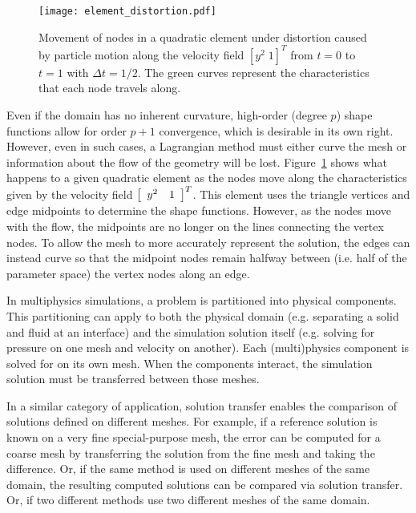 \documentclass[oneside, reqno]{amsart}
\theoremstyle{definition}
\begin{document}
\begin{figure}
  \texttt{[image: element\_distortion.pdf]}
  \centering
  \captionsetup{width=.75\linewidth}
  \caption{Movement of nodes in a quadratic element under distortion caused
    by particle motion along the velocity field \(\left[ y^2 \; 1 \right]^T\)
    from \(t = 0\) to \(t = 1\) with \(\Delta t = 1/2\). The green curves
    represent the characteristics that each node travels along.}
  \label{fig:element-distortion}
\end{figure}

Even if the domain has no inherent curvature, high-order (degree \(p\)) shape
functions allow for order \(p + 1\) convergence, which is desirable in
its own right. However, even in such cases, a Lagrangian method must either
curve the mesh or information about the flow of the geometry will be lost.
Figure~\ref{fig:element-distortion} shows what happens to a given
quadratic element as the nodes move along the
characteristics given by the velocity field
\(\left[ \begin{array}{c c} y^2 & 1 \end{array}\right]^T\).
This element uses the triangle vertices and edge
midpoints to determine the shape functions. However, as the nodes move
with the flow, the midpoints are no longer on the lines connecting
the vertex nodes. To allow the mesh to more accurately represent the
solution, the edges can instead curve so that the midpoint nodes remain
halfway between (i.e. half of the parameter space) the vertex nodes along
an edge.

In multiphysics simulations, a problem is partitioned into physical components.
This partitioning can apply to both the physical domain (e.g. separating a
solid and fluid at an interface) and the simulation solution itself (e.g.
solving for pressure on one mesh and velocity on another). Each (multi)physics
component is solved for on its own mesh. When the components interact, the
simulation solution must be transferred between those meshes.

In a similar category of application, solution transfer enables the comparison
of solutions defined on different meshes. For example, if a reference
solution is known on a very fine special-purpose mesh, the error can be
computed for a coarse mesh by transferring the solution from the fine
mesh and taking the difference. Or, if the same method is used on
different meshes of the same domain, the resulting computed solutions can
be compared via solution transfer. Or, if two different methods use two
different meshes of the same domain.
\end{document}
